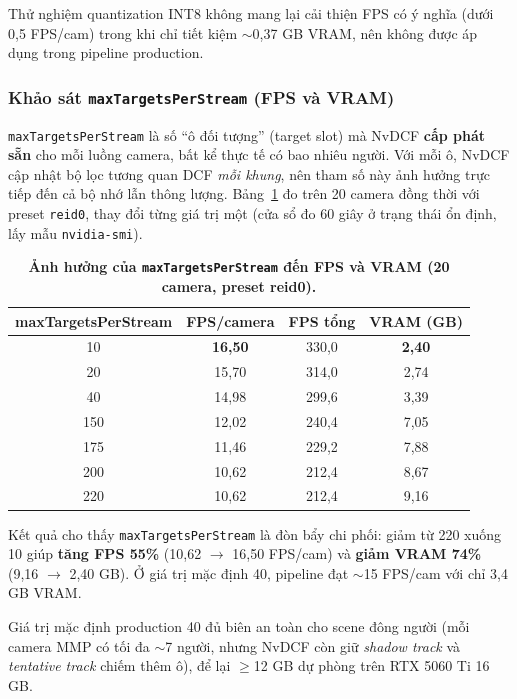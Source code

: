 \documentclass{article} %
\begin{document}
Thử nghiệm quantization INT8 không mang lại cải thiện FPS có ý nghĩa (dưới 0{,}5 FPS/cam) trong khi chỉ tiết kiệm $\sim$0{,}37 GB VRAM, nên không được áp dụng trong pipeline production.

\subsubsection{Khảo sát \texttt{maxTargetsPerStream} (FPS và VRAM)}
\label{sec:maxtargets_ablation}

\texttt{maxTargetsPerStream} là số ``ô đối tượng'' (target slot) mà NvDCF \textbf{cấp phát sẵn} cho mỗi luồng camera, bất kể thực tế có bao nhiêu người. Với mỗi ô, NvDCF cập nhật bộ lọc tương quan DCF \emph{mỗi khung}, nên tham số này ảnh hưởng trực tiếp đến cả bộ nhớ lẫn thông lượng. Bảng~\ref{tab:maxtargets} đo trên 20 camera đồng thời với preset \texttt{reid0}, thay đổi từng giá trị một (cửa sổ đo 60 giây ở trạng thái ổn định, lấy mẫu \texttt{nvidia-smi}).

\begin{table}[H]
    \centering
    \caption[Khảo sát maxTargetsPerStream]{\bfseries\fontsize{12pt}{0pt}\selectfont Ảnh hưởng của \texttt{maxTargetsPerStream} đến FPS và VRAM (20 camera, preset reid0).}
    \begin{tabular}{|c|c|c|c|}
    \hline
    \bfseries maxTargetsPerStream & \bfseries FPS/camera & \bfseries FPS tổng & \bfseries VRAM (GB) \\
    \hline
    10  & \textbf{16,50} & 330,0 & \textbf{2,40} \\
    20  & 15,70 & 314,0 & 2,74 \\
    40  & 14,98 & 299,6 & 3,39 \\
    150 & 12,02 & 240,4 & 7,05 \\
    175 & 11,46 & 229,2 & 7,88 \\
    200 & 10,62 & 212,4 & 8,67 \\
    220 & 10,62 & 212,4 & 9,16 \\
    \hline
    \end{tabular}
    \label{tab:maxtargets}
\end{table}

Kết quả cho thấy \texttt{maxTargetsPerStream} là đòn bẩy chi phối: giảm từ 220 xuống 10 giúp \textbf{tăng FPS 55\%} (10,62 $\to$ 16,50 FPS/cam) và \textbf{giảm VRAM 74\%} (9,16 $\to$ 2,40 GB). Ở giá trị mặc định 40, pipeline đạt $\sim$15 FPS/cam với chỉ 3,4 GB VRAM.

Giá trị mặc định production 40 đủ biên an toàn cho scene đông người (mỗi camera MMP có tối đa $\sim$7 người, nhưng NvDCF còn giữ \textit{shadow track} và \textit{tentative track} chiếm thêm ô), để lại $\geq$12 GB dự phòng trên RTX 5060 Ti 16 GB.
\end{document}
